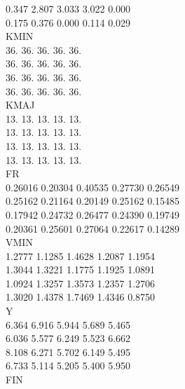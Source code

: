 \documentclass[a4paper,12pt]{article}
\begin{document}
          0.347        2.807        3.033        3.022        0.000\\
          0.175        0.376        0.000        0.114        0.029\\
   KMIN\\
            36.          36.          36.          36.          36.\\
            36.          36.          36.          36.          36.\\
            36.          36.          36.          36.          36.\\
            36.          36.          36.          36.          36.\\
   KMAJ\\
            13.          13.          13.          13.          13.\\
            13.          13.          13.          13.          13.\\
            13.          13.          13.          13.          13.\\
            13.          13.          13.          13.          13.\\
   FR\\
        0.26016      0.20304      0.40535      0.27730      0.26549\\
        0.25162      0.21164      0.20149      0.25162      0.15485\\
        0.17942      0.24732      0.26477      0.24390      0.19749\\
        0.20361      0.25601      0.27064      0.22617      0.14289\\
   VMIN\\
         1.2777       1.1285       1.4628       1.2087       1.1954\\
         1.3044       1.3221       1.1775       1.1925       1.0891\\
         1.0924       1.3257       1.3573       1.2357       1.2706\\
         1.3020       1.4378       1.7469       1.4346       0.8750\\
   Y\\
          6.364        6.916        5.944        5.689        5.465\\
          6.036        5.577        6.249        5.523        6.662\\
          8.108        6.271        5.702        6.149        5.495\\
          6.733        5.114        5.205        5.400        5.950\\
   FIN\\
\end{document}
